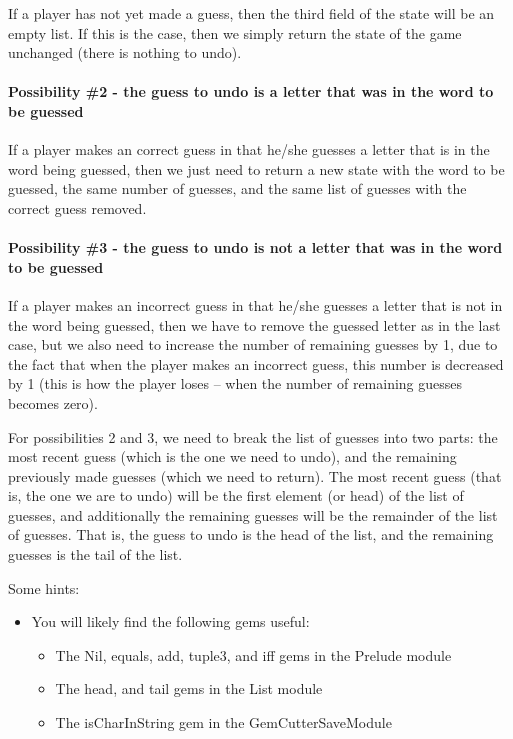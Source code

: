 If a player has not yet made a guess, then the third field of the state will be an empty list.  If this is the case, then we simply return the state of the game unchanged (there is nothing to undo).

\paragraph*{Possibility \#2 - the guess to undo is a letter that was in the word to be guessed}

If a player makes an correct guess in that he/she guesses a letter that is in the word being guessed, then we just need to return a new state with the word to be guessed, the same number of guesses, and the same list of guesses with the correct guess removed.

\paragraph*{Possibility \#3 - the guess to undo is not a letter that was in the word to be guessed}

If a player makes an incorrect guess in that he/she guesses a letter that is not in the word being guessed, then we have to remove the guessed letter as in the last case, but we also need to increase the number of remaining guesses by 1, due to the fact that when the player makes an incorrect guess, this number is decreased by 1 (this is how the player loses -- when the number of remaining guesses becomes zero).

For possibilities 2 and 3, we need to break the list of guesses into two parts: the most recent guess (which is the one we need to undo), and the remaining previously made guesses (which we need to return).  The most recent guess (that is, the one we are to undo) will be the first element (or head) of the list of guesses, and additionally the remaining guesses will be the remainder of the list of guesses.  That is, the guess to undo is the head of the list, and the remaining guesses is the tail of the list.  

Some hints:

\begin{itemize}
	\item You will likely find the following gems useful: 
	\begin{itemize}
		\item The Nil, equals, add, tuple3, and iff gems in the Prelude module
		\item The head, and tail gems in the List module
		\item The isCharInString gem in the GemCutterSaveModule
	\end{itemize}
\end{itemize}